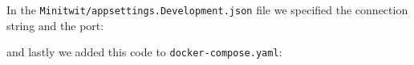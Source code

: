 
In the \texttt{Minitwit/appsettings.Development.json} file we specified the connection string and the port:


and lastly we added this code to \texttt{docker-compose.yaml}:



